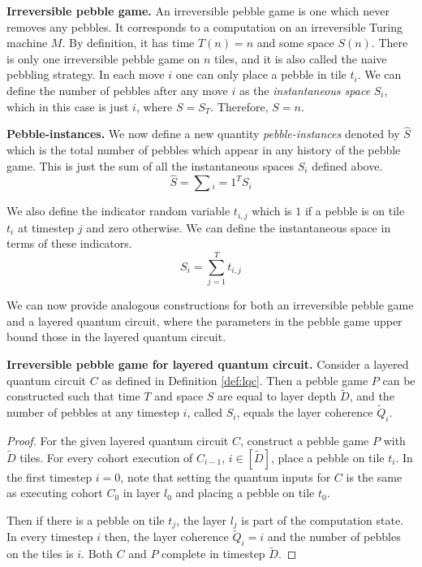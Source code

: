 \begin{definition}{\textbf{Irreversible pebble game.}}
An irreversible pebble game is one which never removes any pebbles.
It corresponds to a computation on an irreversible Turing machine $M$.
By definition, it has time $T(n) = n$ and some space $S(n)$.
There is only one irreversible pebble game on $n$ tiles, and it is also called
the naive pebbling strategy.
In each move $i$ one can only
place a pebble in tile $t_i$.
We can define the number of pebbles after any move $i$ as the \emph{instantaneous space}
$S_i$, which in this case is just $i$, where $S = S_T$.
Therefore, $S = n$.
\end{definition}

\begin{definition}{\textbf{Pebble-instances.}}
We now define a new quantity \emph{pebble-instances} denoted by
$\hat{S}$ which is the total number of pebbles which appear in
any history of the pebble game. This is just the sum of all the
instantaneous spaces $S_i$ defined above.
\begin{equation}
\hat{S} = \sum{_i=1}^T S_i
\end{equation}

We also define the indicator random variable $t_{i,j}$ which is $1$
if a pebble is on tile $t_i$ at timestep $j$ and zero otherwise.
We can define the instantaneous space in terms of these indicators.
\begin{equation}
S_i = \sum_{j=1}^T t_{i,j}
\end{equation}
\end{definition}

We can now provide analogous constructions for both an irreversible pebble game
and a layered quantum circuit, where the parameters in the pebble game
upper bound those in the layered quantum circuit.

\begin{theorem}{\textbf{Irreversible pebble game for layered quantum circuit.}}
Consider a layered quantum circuit $C$
as defined in 
Definition \ref{def:lqc}. Then a pebble game $P$ can be constructed such that
time $T$ and space $S$ are equal to layer depth $\tilde{D}$,
and the number of pebbles at any timestep $i$, called $S_i$, equals the
layer coherence $\tilde{Q}_i$.
\label{thm:ipg-lqc}
\end{theorem}

\begin{proof}
For the given layered quantum circuit $C$, construct a pebble game $P$
with $\tilde{D}$ tiles. For every cohort execution of $C_{i-1}$, $i \in [\tilde{D}]$,
place a pebble on tile $t_i$.
In the first timestep $i=0$, note that setting the quantum inputs for $C$
is the same as executing cohort $C_0$ in layer $l_0$ and 
placing a pebble on tile $t_0$.

Then if there is a pebble on tile $t_j$,
the layer $l_j$ is part of the computation state. In every timestep $i$ then, the layer coherence
$\tilde{Q}_i = i$ and the number of pebbles on the tiles is $i$.
Both $C$ and $P$ complete in timestep $\tilde{D}$.
\end{proof}

